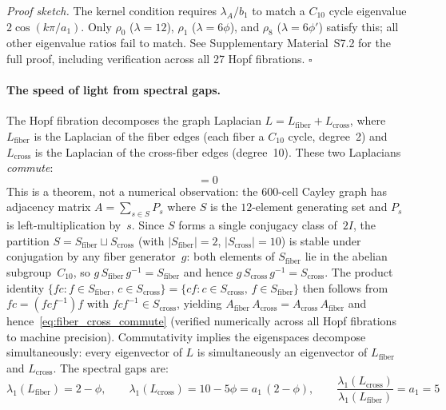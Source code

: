 \documentclass[12pt,a4paper]{article}
\theoremstyle{definition}
\begin{document}
\noindent\textit{Proof sketch.}  The kernel condition requires $\lambda_A/b_1$ to match a $C_{10}$ cycle eigenvalue $2\cos(k\pi/a_1)$.  Only $\rho_0$ ($\lambda = 12$), $\rho_1$ ($\lambda = 6\phi$), and $\rho_8$ ($\lambda = 6\phi'$) satisfy this; all other eigenvalue ratios fail to match.  See Supplementary Material~S7.2 for the full proof, including verification across all 27 Hopf fibrations.  \hfill$\square$

\paragraph{The speed of light from spectral gaps.}
The Hopf fibration decomposes the graph Laplacian $L = L_{\mathrm{fiber}} + L_{\mathrm{cross}}$, where $L_{\mathrm{fiber}}$ is the Laplacian of the fiber edges (each fiber a $C_{10}$ cycle, degree~2) and $L_{\mathrm{cross}}$ is the Laplacian of the cross-fiber edges (degree~10).  These two Laplacians \emph{commute}:
\begin{equation}
[L_{\mathrm{fiber}},\, L_{\mathrm{cross}}] = 0
\label{eq:fiber_cross_commute}
\end{equation}
This is a theorem, not a numerical observation: the 600-cell Cayley graph has adjacency matrix $A = \sum_{s \in S} P_s$ where $S$ is the $12$-element generating set and $P_s$ is left-multiplication by~$s$.  Since $S$ forms a single conjugacy class of~$2I$, the partition $S = S_{\mathrm{fiber}} \sqcup S_{\mathrm{cross}}$ (with $|S_{\mathrm{fiber}}| = 2$, $|S_{\mathrm{cross}}| = 10$) is stable under conjugation by any fiber generator~$g$: both elements of $S_{\mathrm{fiber}}$ lie in the abelian subgroup~$C_{10}$, so $g\,S_{\mathrm{fiber}}\,g^{-1} = S_{\mathrm{fiber}}$ and hence $g\,S_{\mathrm{cross}}\,g^{-1} = S_{\mathrm{cross}}$.  The product identity $\{fc : f \!\in\! S_{\mathrm{fiber}},\, c \!\in\! S_{\mathrm{cross}}\} = \{cf : c \!\in\! S_{\mathrm{cross}},\, f \!\in\! S_{\mathrm{fiber}}\}$ then follows from $fc = (fcf^{-1})f$ with $fcf^{-1} \in S_{\mathrm{cross}}$, yielding $A_{\mathrm{fiber}}\,A_{\mathrm{cross}} = A_{\mathrm{cross}}\,A_{\mathrm{fiber}}$ and hence~\eqref{eq:fiber_cross_commute} (verified numerically across all Hopf fibrations to machine precision).  Commutativity implies the eigenspaces decompose simultaneously: every eigenvector of $L$ is simultaneously an eigenvector of $L_{\mathrm{fiber}}$ and $L_{\mathrm{cross}}$.  The spectral gaps are:
\begin{equation}
\lambda_1(L_{\mathrm{fiber}}) = 2 - \phi, \qquad
\lambda_1(L_{\mathrm{cross}}) = 10 - 5\phi = a_1\,(2 - \phi), \qquad
\frac{\lambda_1(L_{\mathrm{cross}})}{\lambda_1(L_{\mathrm{fiber}})} = a_1 = 5
\label{eq:spectral_gap_ratio}
\end{equation}
\end{document}
